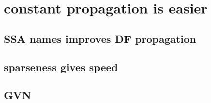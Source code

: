\chapter{constant propagation is easier}



\section{SSA names improves DF propagation}
\section{sparseness gives speed}
\section{GVN}

